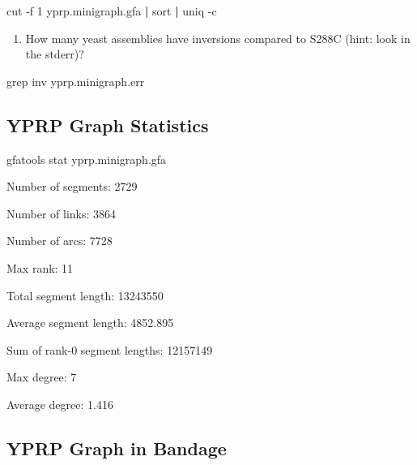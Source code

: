 \documentclass[
]{book}
\newenvironment{Shaded}{\begin{snugshade}}{\end{snugshade}}
\newcommand{\AttributeTok}[1]{\textcolor[rgb]{0.77,0.63,0.00}{#1}}
\newcommand{\ExtensionTok}[1]{#1}
\newcommand{\FunctionTok}[1]{\textcolor[rgb]{0.00,0.00,0.00}{#1}}
\newcommand{\KeywordTok}[1]{\textcolor[rgb]{0.13,0.29,0.53}{\textbf{#1}}}
\newcommand{\NormalTok}[1]{#1}
\providecommand{\tightlist}{%
  \setlength{\itemsep}{0pt}\setlength{\parskip}{0pt}}
\begin{document}
\begin{Shaded}
\begin{Highlighting}[]
\FunctionTok{cut} \AttributeTok{{-}f}\NormalTok{ 1 yprp.minigraph.gfa }\KeywordTok{|} \FunctionTok{sort} \KeywordTok{|} \FunctionTok{uniq} \AttributeTok{{-}c}
\end{Highlighting}
\end{Shaded}

\begin{enumerate}
\def\labelenumi{\arabic{enumi}.}
\setcounter{enumi}{2}
\tightlist
\item
  How many yeast assemblies have inversions compared to S288C (hint: look in the stderr)?
\end{enumerate}

\begin{Shaded}
\begin{Highlighting}[]
\FunctionTok{grep}\NormalTok{ inv yprp.minigraph.err}
\end{Highlighting}
\end{Shaded}

\hypertarget{yprp-graph-statistics}{%
\subsection*{YPRP Graph Statistics}\label{yprp-graph-statistics}}

\begin{Shaded}
\begin{Highlighting}[]
\ExtensionTok{gfatools}\NormalTok{ stat yprp.minigraph.gfa}
\end{Highlighting}
\end{Shaded}

Number of segments: 2729

Number of links: 3864

Number of arcs: 7728

Max rank: 11

Total segment length: 13243550

Average segment length: 4852.895

Sum of rank-0 segment lengths: 12157149

Max degree: 7

Average degree: 1.416

\hypertarget{yprp-graph-in-bandage}{%
\subsection*{YPRP Graph in Bandage}\label{yprp-graph-in-bandage}}
\end{document}
